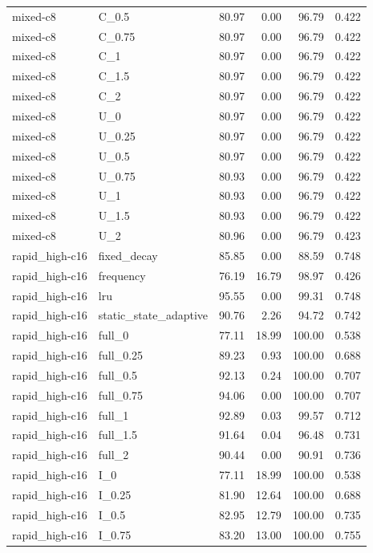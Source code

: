 \begin{longtable}{llrrrr}
mixed-c8 & C\_0.5 & 80.97 & 0.00 & 96.79 & 0.422\\
mixed-c8 & C\_0.75 & 80.97 & 0.00 & 96.79 & 0.422\\
mixed-c8 & C\_1 & 80.97 & 0.00 & 96.79 & 0.422\\
mixed-c8 & C\_1.5 & 80.97 & 0.00 & 96.79 & 0.422\\
mixed-c8 & C\_2 & 80.97 & 0.00 & 96.79 & 0.422\\
mixed-c8 & U\_0 & 80.97 & 0.00 & 96.79 & 0.422\\
mixed-c8 & U\_0.25 & 80.97 & 0.00 & 96.79 & 0.422\\
mixed-c8 & U\_0.5 & 80.97 & 0.00 & 96.79 & 0.422\\
mixed-c8 & U\_0.75 & 80.93 & 0.00 & 96.79 & 0.422\\
mixed-c8 & U\_1 & 80.93 & 0.00 & 96.79 & 0.422\\
mixed-c8 & U\_1.5 & 80.93 & 0.00 & 96.79 & 0.422\\
mixed-c8 & U\_2 & 80.96 & 0.00 & 96.79 & 0.423\\
rapid\_high-c16 & fixed\_decay & 85.85 & 0.00 & 88.59 & 0.748\\
rapid\_high-c16 & frequency & 76.19 & 16.79 & 98.97 & 0.426\\
rapid\_high-c16 & lru & 95.55 & 0.00 & 99.31 & 0.748\\
rapid\_high-c16 & static\_state\_adaptive & 90.76 & 2.26 & 94.72 & 0.742\\
rapid\_high-c16 & full\_0 & 77.11 & 18.99 & 100.00 & 0.538\\
rapid\_high-c16 & full\_0.25 & 89.23 & 0.93 & 100.00 & 0.688\\
rapid\_high-c16 & full\_0.5 & 92.13 & 0.24 & 100.00 & 0.707\\
rapid\_high-c16 & full\_0.75 & 94.06 & 0.00 & 100.00 & 0.707\\
rapid\_high-c16 & full\_1 & 92.89 & 0.03 & 99.57 & 0.712\\
rapid\_high-c16 & full\_1.5 & 91.64 & 0.04 & 96.48 & 0.731\\
rapid\_high-c16 & full\_2 & 90.44 & 0.00 & 90.91 & 0.736\\
rapid\_high-c16 & I\_0 & 77.11 & 18.99 & 100.00 & 0.538\\
rapid\_high-c16 & I\_0.25 & 81.90 & 12.64 & 100.00 & 0.688\\
rapid\_high-c16 & I\_0.5 & 82.95 & 12.79 & 100.00 & 0.735\\
rapid\_high-c16 & I\_0.75 & 83.20 & 13.00 & 100.00 & 0.755\\

\end{longtable}
